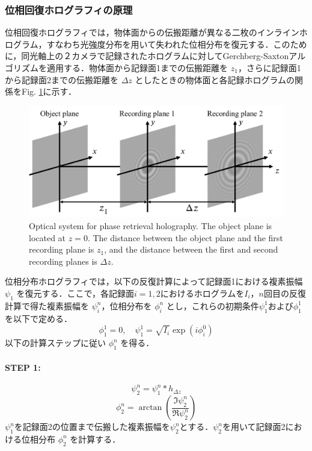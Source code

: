 \subsubsection{位相回復ホログラフィの原理}\label{sec:phaseRetrieval}
位相回復ホログラフィ\cite{phaseretrieval}では，物体面からの伝搬距離が異なる二枚のインラインホログラム，すなわち光強度分布を用いて失われた位相分布を復元する\cite{zhang2003,tanaka2016}．このために，同光軸上の２カメラで記録されたホログラムに対してGerchberg-Saxtonアルゴリズム\cite{gerchberg1972}を適用する．物体面から記録面1までの伝搬距離を $z_1$，さらに記録面1から記録面2までの伝搬距離を $\Delta z$ としたときの物体面と各記録ホログラムの関係をFig. \ref{fig:phaseRetrievalOptics}に示す．
\begin{figure}[htbp]
    \centering
    \includegraphics[width=0.8\linewidth]{./Figure/2_Theory/pralignment.pdf}
    \caption{Optical system for phase retrieval holography. The object plane is located at $z = 0$. The distance between the object plane and the first recording plane is $z_1$, and the distance between the first and second recording planes is $\Delta z$.}
    \label{fig:phaseRetrievalOptics}
\end{figure}
位相分布ホログラフィでは，以下の反復計算によって記録面1における複素振幅 $\psi_1$ を復元する．ここで，各記録面$i=1,2$におけるホログラムを$I_i$，$n$回目の反復計算で得た複素振幅を $\psi_i^n$，位相分布を $\phi_i^n$ とし，これらの初期条件$\psi_1^1$および$\phi_1^1$を以下で定める．
\begin{equation}
    \phi_1^1 = 0,  \quad \psi_1^1 = \sqrt{I_i} \exp{(i\phi_i^0)}
\end{equation}
以下の計算ステップに従い $\phi_1^n$ を得る．


\paragraph{STEP 1:}
\begin{equation}
    \psi_2^n = \psi_1^n * h_{\Delta z}
\end{equation}
\begin{equation}
    \phi_2^{n} = \arctan{\left( \frac{\Im \psi_2^n}{\Re \psi_2^n} \right)}
\end{equation}
$\psi_1^n$を記録面2の位置まで伝搬した複素振幅を$\psi_2^n$とする．$\psi_2^n$を用いて記録面2における位相分布 $\phi_2^n$ を計算する．

